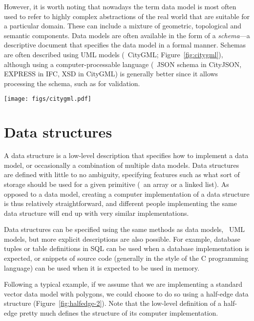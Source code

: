 However, it is worth noting that nowadays the term data model is most often used to refer to highly complex abstractions of the real world that are suitable for a particular domain.
These can include a mixture of geometric, topological and semantic components.
Data models are often available in the form of a \emph{schema}---a descriptive document that specifies the data model in a formal manner.
Schemas are often described using UML models (\eg\ CityGML; Figure~\ref{fig:citygml}), although using a computer-processable language (\eg\ JSON schema in CityJSON, EXPRESS in IFC, XSD in CityGML) is generally better since it allows processing the schema, such as for validation.

\begin{figure*}
\centering
\texttt{[image: figs/citygml.pdf]}
\caption{The geometry classes used in the CityGML 2.0 standard~\citep{CityGML2.0}.}%
\label{fig:citygml}
\end{figure*}

\section{Data structures}

A data structure is a low-level description that specifies how to implement a data model, or occasionally a combination of multiple data models.
Data structures are defined with little to no ambiguity, specifying features such as what sort of storage should be used for a given primitive (\eg\ an array or a linked list). 
As opposed to a data model, creating a computer implementation of a data structure is thus relatively straightforward, and different people implementing the same data structure will end up with very similar implementations.

Data structures can be specified using the same methods as data models, \eg\ UML models, but more explicit descriptions are also possible.
For example, database tuples or table definitions in SQL can be used when a database implementation is expected, or snippets of source code  (generally in the style of the C programming language) can be used when it is expected to be used in memory.

Following a typical example, if we assume that we are implementing a standard vector data model with polygons, we could choose to do so using a half-edge data structure (Figure~\ref{fig:halfedge-2}).
Note that the low-level definition of a half-edge pretty much defines the structure of its computer implementation.

